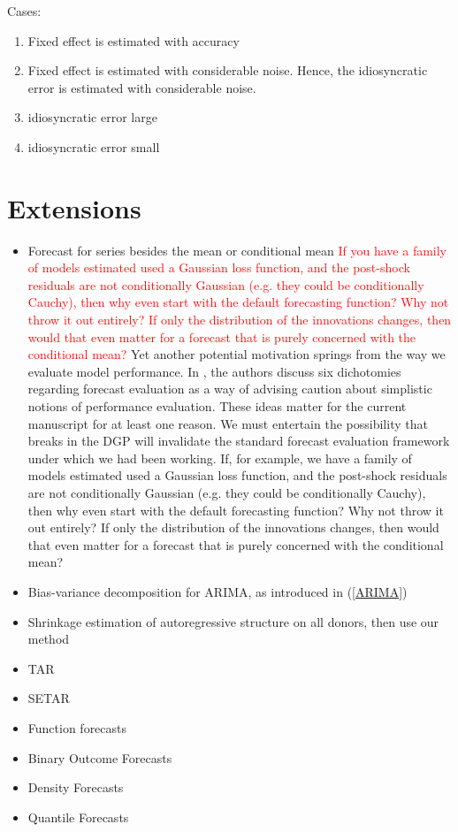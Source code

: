 \documentclass[11pt]{article}
\theoremstyle{definition}
\begin{document}
Cases:
\begin{enumerate}
  \item Fixed effect is estimated with accuracy 
  \item Fixed effect is estimated with considerable noise.  Hence, the idiosyncratic error is estimated with considerable noise.
  \item idiosyncratic error large
  \item idiosyncratic error small
\end{enumerate}  

\section{Extensions}\label{Extensions}

\begin{itemize}
  \item Forecast for series besides the mean or conditional mean \textcolor{red}{If you have a family of models estimated used a Gaussian loss function, and the post-shock residuals are not conditionally Gaussian (e.g. they could be conditionally Cauchy), then why even start with the default forecasting function?  Why not throw it out entirely?  If only the distribution of the innovations changes, then would that even matter for a forecast that is purely concerned with the conditional mean?} Yet another potential motivation springs from the way we evaluate model performance.  In \cite{clements2005evaluating}, the authors discuss six dichotomies regarding forecast evaluation as a way of advising caution about simplistic notions of performance evaluation.  These ideas matter for the current manuscript for at least one reason.  We must entertain the possibility that breaks in the DGP will invalidate the standard forecast evaluation framework under which we had been working.  If, for example, we have a family of models estimated used a Gaussian loss function, and the post-shock residuals are not conditionally Gaussian (e.g. they could be conditionally Cauchy), then why even start with the default forecasting function?  Why not throw it out entirely?  If only the distribution of the innovations changes, then would that even matter for a forecast that is purely concerned with the conditional mean?
  \item Bias-variance decomposition for ARIMA, as introduced in (\ref{ARIMA})
  \item Shrinkage estimation of autoregressive structure on all donors, then use our method
  \item TAR
  \item SETAR
  \item Function forecasts
  \item Binary Outcome Forecasts
  \item Density Forecasts
  \item Quantile Forecasts
\end{itemize}
\end{document}
